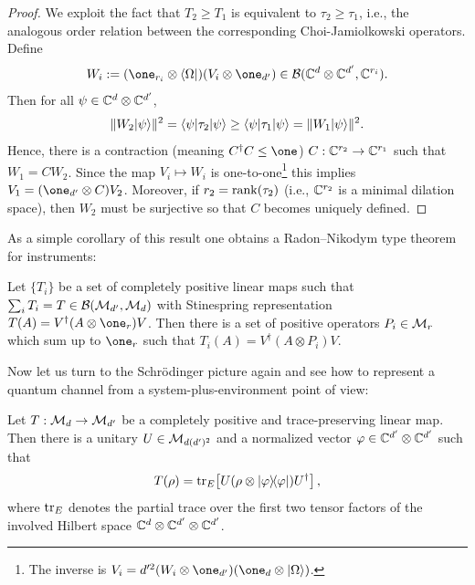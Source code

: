 \documentclass[11pt,a4paper]{article}
\numberwithin{equation}{section}
\theoremstyle{plain}
\theoremstyle{definition}
\begin{document}
\begin{proof}
    We exploit the fact that $T_2 \ge T_1$ is equivalent to $\tau_2 \ge \tau_1$, i.e.,
    the analogous order relation between the corresponding Choi-Jamiolkowski operators.
    Define
    \[
        W_i := (\one_{r_i} \otimes \bra{\Omega}) (V_i \otimes \one_{d'})
        \in \mcB(\CC^d\otimes \CC^{d'},\CC^{r_i}).
    \]
    Then for all $\psi \in \mathbb{C}^d \otimes \mathbb{C}^{d'}$,
    \begin{equation}\label{eq:2.13}
        \|W_2|\psi\rangle\|^2 = \langle\psi|\tau_2|\psi\rangle \ge \langle\psi|\tau_1|\psi\rangle
        = \|W_1|\psi\rangle\|^2.
    \end{equation}
    Hence, there is a contraction (meaning $C^\dagger C \le \one$)
    $C:\mathbb{C}^{r_2}\to \mathbb{C}^{r_1}$ such that $W_1 = C W_2$. Since the map $V_i\mapsto W_i$
    is one-to-one\footnote{The inverse is
        $V_i = d'^2 (W_i\otimes \one_{d'})(\one_d\otimes \ket{\Omega})$.}
    this implies $V_1=(\one_{d'}\otimes C)V_2$. Moreover, if $r_2=\operatorname{rank}(\tau_2)$ (i.e.,
    $\mathbb{C}^{r_2}$ is a minimal dilation space), then $W_2$ must be surjective so that $C$
    becomes uniquely defined.
\end{proof}

As a simple corollary of this result one obtains a Radon--Nikodym type theorem for
instruments:

\begin{theorem}
    Let $\{T_i\}$ be a set of completely positive linear maps such that
    $\sum_i T_i = T \in \mathcal{B}(\mathcal{M}_{d'},\mathcal{M}_d)$ with Stinespring representation
    $T(A)=V^\dagger(A\otimes \one_r)V$. Then there is a set of positive operators
    $P_i \in \mathcal{M}_r$ which sum up to $\one_r$ such that $T_i(A)=V^\dagger(A\otimes P_i)V$.
\end{theorem}

Now let us turn to the Schr\"odinger picture again and see how to represent a
quantum channel from a system-plus-environment point of view:

\begin{theorem}
    Let $T:\mathcal{M}_d \to \mathcal{M}_{d'}$ be a completely positive and trace-preserving linear
    map. Then there is a unitary $U\in \mathcal{M}_{d(d')^2}$ and a normalized vector
    $\varphi \in \mathbb{C}^{d'} \otimes \mathbb{C}^{d'}$ such that
    \begin{equation}\label{eq:2.14}
        T(\rho) = \operatorname{tr}_E\!\left[U(\rho \otimes |\varphi\rangle\!\langle\varphi|)U^\dagger\right],
    \end{equation}
    where $\operatorname{tr}_E$ denotes the partial trace over the first two tensor factors of the
    involved Hilbert space $\mathbb{C}^d \otimes \mathbb{C}^{d'} \otimes \mathbb{C}^{d'}$.
\end{theorem}
\end{document}
